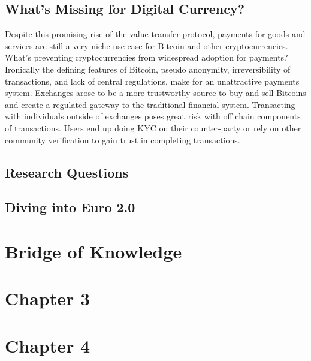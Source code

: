 \documentclass[12pt]{article} %
\begin{document}
\subsection{What's Missing for Digital Currency?}
Despite this promising rise of the value transfer protocol, payments for goods and services are still a very niche use case for Bitcoin and other cryptocurrencies. What's preventing cryptocurrencies from widespread adoption for payments? Ironically the defining features of Bitcoin, pseudo anonymity, irreversibility of transactions, and lack of central regulations, make for an unattractive payments system. Exchanges arose to be a more trustworthy source to buy and sell Bitcoins and create a regulated gateway to the traditional financial system. Transacting with individuals outside of exchanges poses great risk with off chain components of transactions. Users end up doing KYC on their counter-party or rely on other community verification to gain trust in completing transactions.

\subsection{Research Questions}

\subsection{Diving into Euro 2.0}

\pagebreak

\section{Bridge of Knowledge}
\label{Bridge of Knowledge}


\pagebreak

\section{Chapter 3}
\label{Chapter 3}


\pagebreak

\section{Chapter 4}
\label{Chapter 4}
\end{document}
